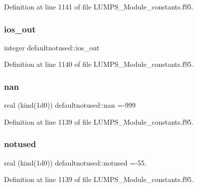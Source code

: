 Definition at line 1141 of file L\+U\+M\+P\+S\+\_\+\+Module\+\_\+constants.\+f95.

\mbox{\label{namespacedefaultnotused_a94842c2506c0ba5662c919686e38efcc}} 
\subsubsection{\texorpdfstring{ios\+\_\+out}{ios\_out}}
{\footnotesize\ttfamily integer defaultnotused\+::ios\+\_\+out}



Definition at line 1140 of file L\+U\+M\+P\+S\+\_\+\+Module\+\_\+constants.\+f95.

\mbox{\label{namespacedefaultnotused_a9ad6683bfdf839485292f0be53501f07}} 
\subsubsection{\texorpdfstring{nan}{nan}}
{\footnotesize\ttfamily real (kind(1d0)) defaultnotused\+::nan =-\/999}



Definition at line 1139 of file L\+U\+M\+P\+S\+\_\+\+Module\+\_\+constants.\+f95.

\mbox{\label{namespacedefaultnotused_a71e2d536a1c83e98103c3ed183c303cd}} 
\subsubsection{\texorpdfstring{notused}{notused}}
{\footnotesize\ttfamily real (kind(1d0)) defaultnotused\+::notused =-\/55.}



Definition at line 1139 of file L\+U\+M\+P\+S\+\_\+\+Module\+\_\+constants.\+f95.

\mbox{\label{namespacedefaultnotused_afd5393d7b0bd5eadd9ebcf66bd974e0d}} 
